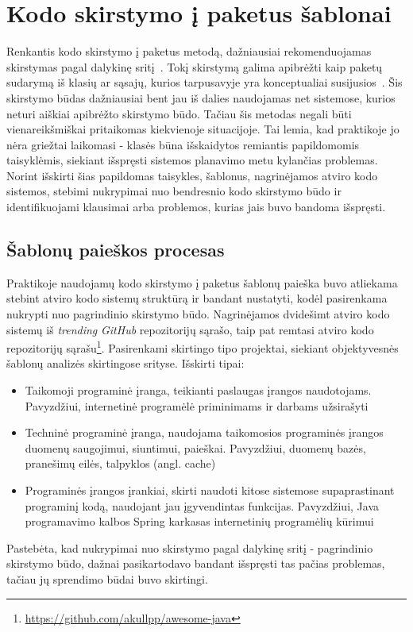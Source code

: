 \section{Kodo skirstymo į paketus šablonai}
Renkantis kodo skirstymo į paketus metodą, dažniausiai rekomenduojamas skirstymas pagal dalykinę sritį~\cite{DomainDrivenDesign}.
Tokį skirstymą galima apibrėžti kaip paketų sudarymą iš klasių ar sąsajų, kurios tarpusavyje yra konceptualiai susijusios~\cite{Functional}.
Šis skirstymo būdas dažniausiai bent jau iš dalies naudojamas net sistemose, kurios neturi aiškiai apibrėžto skirstymo būdo.
Tačiau šis metodas negali būti vienareikšmiškai pritaikomas kiekvienoje situacijoje.
Tai lemia, kad praktikoje jo nėra griežtai laikomasi - klasės būna išskaidytos remiantis papildomomis taisyklėmis,
siekiant išspręsti sistemos planavimo metu kylančias problemas.
Norint išskirti šias papildomas taisykles, šablonus, nagrinėjamos atviro kodo sistemos,
stebimi nukrypimai nuo bendresnio kodo skirstymo būdo ir identifikuojami klausimai arba problemos, kurias jais buvo bandoma išspręsti.

\subsection{Šablonų paieškos procesas}
Praktikoje naudojamų kodo skirstymo į paketus šablonų paieška buvo atliekama stebint atviro kodo sistemų struktūrą ir bandant nustatyti, kodėl pasirenkama nukrypti
nuo pagrindinio skirstymo būdo.
Nagrinėjamos dvidešimt atviro kodo sistemų iš \textit{trending} \textit{GitHub} repozitorijų sąrašo, taip pat remtasi atviro kodo repozitorijų
sąrašu\footnote{\url{https://github.com/akullpp/awesome-java}}.
Pasirenkami skirtingo tipo projektai, siekiant
objektyvesnės šablonų analizės skirtingose srityse.
Išskirti tipai:
\begin{itemize}
    \item Taikomoji programinė įranga, teikianti paslaugas įrangos naudotojams. Pavyzdžiui,
    internetinė programėlė priminimams ir darbams užsirašyti
    \item Techninė programinė įranga, naudojama taikomosios programinės įrangos duomenų
    saugojimui, siuntimui, paieškai. Pavyzdžiui, duomenų bazės, pranešimų eilės, talpyklos
    (angl. cache)
    \item Programinės įrangos įrankiai, skirti naudoti kitose sistemose supaprastinant programinį
    kodą, naudojant jau įgyvendintas funkcijas. Pavyzdžiui, Java programavimo kalbos
    Spring karkasas internetinių programėlių kūrimui
\end{itemize}
Pastebėta, kad nukrypimai nuo skirstymo pagal dalykinę sritį - pagrindinio skirstymo būdo, dažnai pasikartodavo bandant išspręsti tas pačias problemas,
tačiau jų sprendimo būdai buvo skirtingi.

